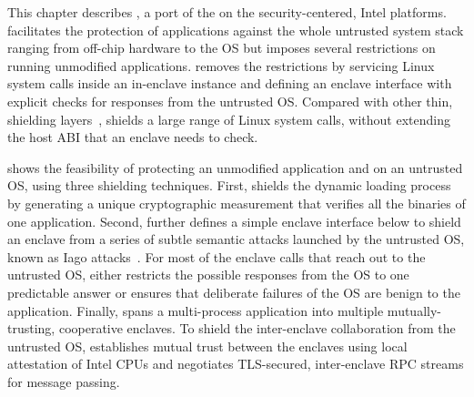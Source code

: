 
This chapter describes \graphenesgx{},
a port of the \graphene{} \libos{} on the security-centered, Intel \sgx{} platforms.
\sgx{} facilitates the protection of applications
against the whole untrusted system stack ranging from off-chip hardware to the OS
but imposes several restrictions on running unmodified applications.
\graphenesgx{} removes the restrictions
by servicing Linux system calls inside an in-enclave \libos{} instance and defining an enclave interface with explicit checks for responses from the untrusted OS.
Compared with other thin, shielding layers~\cite{osdi16scone,shinde17panoply}, \graphenesgx{} shields a large range of Linux system calls,
without extending the host ABI that an enclave needs to check.



\graphenesgx{} shows the feasibility
of protecting an unmodified application and \libos{} on an untrusted OS, using three shielding techniques.
First, \graphenesgx{}
shields the dynamic loading process
by generating a unique cryptographic measurement that verifies all the binaries of one application.
Second, \graphenesgx{} further defines a simple
enclave interface
below \thehostabi{} to shield an enclave from a series of subtle semantic attacks
launched by the untrusted OS, known as Iago attacks~\cite{checkoway13iago}.
For most of the enclave calls that reach out to the untrusted OS,
\graphenesgx{} either restricts the possible responses
from the OS to one predictable answer
or ensures that deliberate failures of the OS are benign to the application.
Finally, \graphenesgx{} spans a multi-process application
into multiple mutually-trusting, cooperative enclaves.
To shield the inter-enclave collaboration from the untrusted OS,
\graphenesgx{} establishes mutual trust between the enclaves
using local attestation of Intel CPUs
and negotiates TLS-secured, inter-enclave RPC streams for message passing.


